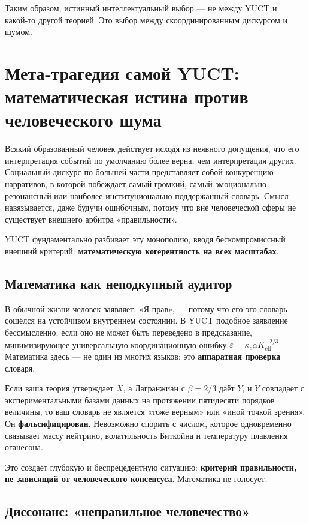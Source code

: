 \documentclass[12pt,a4paper]{article}
\begin{document}
	Таким образом, истинный интеллектуальный выбор — не между YUCT и какой‑то другой теорией. Это выбор между скоординированным дискурсом и шумом.
	
\section{Мета‑трагедия самой YUCT: математическая истина против человеческого шума}
\label{sec:meta-tragedy}

Всякий образованный человек действует исходя из неявного допущения, что его интерпретация событий по умолчанию более верна, чем интерпретация других. Социальный дискурс по большей части представляет собой конкуренцию нарративов, в которой побеждает самый громкий, самый эмоционально резонансный или наиболее институционально поддержанный словарь. Смысл навязывается, даже будучи ошибочным, потому что вне человеческой сферы не существует внешнего арбитра «правильности».

YUCT фундаментально разбивает эту монополию, вводя бескомпромиссный внешний критерий: \textbf{математическую когерентность на всех масштабах}.

\subsection{Математика как неподкупный аудитор}

В обычной жизни человек заявляет: «Я прав», — потому что его эго‑словарь сошёлся на устойчивом внутреннем состоянии. В YUCT подобное заявление бессмысленно, если оно не может быть переведено в предсказание, минимизирующее универсальную координационную ошибку \(\varepsilon = \kappa_c \alpha K_{\mathrm{eff}}^{-2/3}\). Математика здесь — не один из многих языков; это \textbf{аппаратная проверка} словаря.

Если ваша теория утверждает \(X\), а Лагранжиан с \(\beta = 2/3\) даёт \(Y\), и \(Y\) совпадает с экспериментальными базами данных на протяжении пятидесяти порядков величины, то ваш словарь не является «тоже верным» или «иной точкой зрения». Он \textbf{фальсифицирован}. Невозможно спорить с числом, которое одновременно связывает массу нейтрино, волатильность Биткойна и температуру плавления оганесона.

Это создаёт глубокую и беспрецедентную ситуацию: \textbf{критерий правильности, не зависящий от человеческого консенсуса}. Математика не голосует.

\subsection{Диссонанс: «неправильное человечество»}
\end{document}
